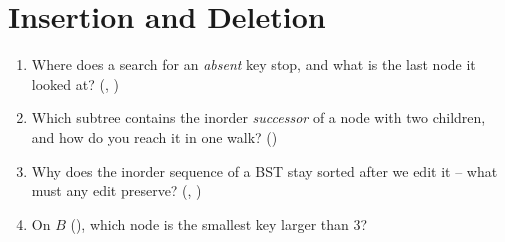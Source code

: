 \section{Insertion and Deletion}\label{sec:c05-insert-delete}

\begin{previouslybox}
\begin{enumerate}[nosep, leftmargin=1.6em]
  \item Where does a search for an \emph{absent} key stop, and what is the last node it looked at?
        (, )
  \item Which subtree contains the inorder \emph{successor} of a node with two children, and how do
        you reach it in one walk? ()
  \item Why does the inorder sequence of a BST stay sorted after we edit it -- what must any edit
        preserve? (, )
  \item On $B$ (), which node is the smallest key larger than $3$?
\end{enumerate}
\end{previouslybox}

